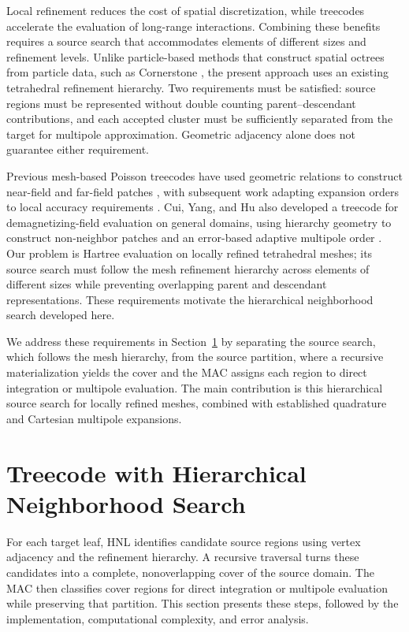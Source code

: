 \documentclass[a4paper,pdflatex,sn-mathphys-num]{sn-jnl}
\theoremstyle{thmstyleone}
\begin{document}
Local refinement reduces the cost of spatial discretization, while treecodes accelerate the evaluation of long-range interactions. Combining these benefits requires a source search that accommodates elements of different sizes and refinement levels. Unlike particle-based methods that construct spatial octrees from particle data, such as Cornerstone \cite{Keller2023}, the present approach uses an existing tetrahedral refinement hierarchy. Two requirements must be satisfied: source regions must be represented without double counting parent--descendant contributions, and each accepted cluster must be sufficiently separated from the target for multipole approximation. Geometric adjacency alone does not guarantee either requirement.

Previous mesh-based Poisson treecodes have used geometric relations to construct near-field and far-field patches \cite{Cui}, with subsequent work adapting expansion orders to local accuracy requirements \cite{CuiYang2025}. Cui, Yang, and Hu also developed a treecode for demagnetizing-field evaluation on general domains, using hierarchy geometry to construct non-neighbor patches and an error-based adaptive multipole order \cite{CuiYangHu2025}. Our problem is Hartree evaluation on locally refined tetrahedral meshes; its source search must follow the mesh refinement hierarchy across elements of different sizes while preventing overlapping parent and descendant representations. These requirements motivate the hierarchical neighborhood search developed here.

We address these requirements in Section~\ref{sec:proposed_method} by separating the source search, which follows the mesh hierarchy, from the source partition, where a recursive materialization yields the cover and the MAC assigns each region to direct integration or multipole evaluation. The main contribution is this hierarchical source search for locally refined meshes, combined with established quadrature and Cartesian multipole expansions.

\section{Treecode with Hierarchical Neighborhood Search}
\label{sec:proposed_method}

For each target leaf, HNL identifies candidate source regions using vertex adjacency and the refinement hierarchy. A recursive traversal turns these candidates into a complete, nonoverlapping cover of the source domain. The MAC then classifies cover regions for direct integration or multipole evaluation while preserving that partition. This section presents these steps, followed by the implementation, computational complexity, and error analysis.
\end{document}
